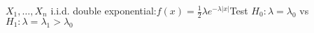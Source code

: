 \documentclass[preview]{standalone}
\begin{document}
\begin{center}
$X_1,\ldots,X_n$ i.i.d. double exponential:$f(x) = \frac12\lambda e^{-\lambda|x|}$Test $H_0: \lambda=\lambda_0$ vs $H_1: \lambda=\lambda_1 > \lambda_0$
\end{center}
\end{document}
